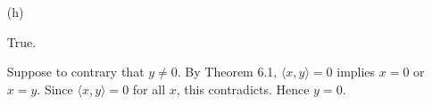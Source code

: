 \begin{Exercise}
\begin{enumerate}[(a)]
		\item[(h)]
		\begin{answer}
			True.
		\end{answer}
		\begin{solution}
			Suppose to contrary that $y\neq 0$. By Theorem 6.1, $\langle x, y \rangle = 0$ implies $x = 0$ or $x = y$. Since $\langle x,y \rangle = 0$ for all $x$, this contradicts. Hence $y = 0$.
		\end{solution}
		
	\end{enumerate}
\end{Exercise}